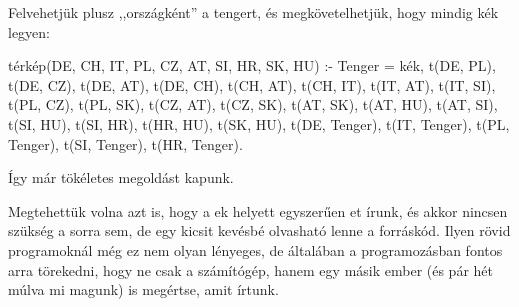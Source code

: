 Felvehetjük plusz ,,országként'' a tengert, és
megkövetelhetjük, hogy mindig kék legyen:
\begin{program}
térkép(DE, CH, IT, PL, CZ, AT, SI, HR, SK, HU) :-
    Tenger = kék,
    t(DE, PL), t(DE, CZ), t(DE, AT), t(DE, CH),
    t(CH, AT), t(CH, IT),
    t(IT, AT), t(IT, SI),
    t(PL, CZ), t(PL, SK),
    t(CZ, AT), t(CZ, SK),
    t(AT, SK), t(AT, HU), t(AT, SI),
    t(SI, HU), t(SI, HR),
    t(HR, HU),
    t(SK, HU),
    t(DE, Tenger), t(IT, Tenger), t(PL, Tenger),
    t(SI, Tenger), t(HR, Tenger).
\end{program}
Így már tökéletes megoldást kapunk.

Megtehettük volna azt is, hogy a ek
helyett egyszerűen et írunk, és akkor
nincsen szükség a  sorra sem, de
egy kicsit kevésbé olvasható lenne a
forráskód. Ilyen rövid programoknál még ez nem olyan
lényeges, de általában a programozásban fontos arra
törekedni, hogy ne csak a számítógép, hanem egy
másik ember (és pár hét múlva mi magunk) is
megértse, amit írtunk.
